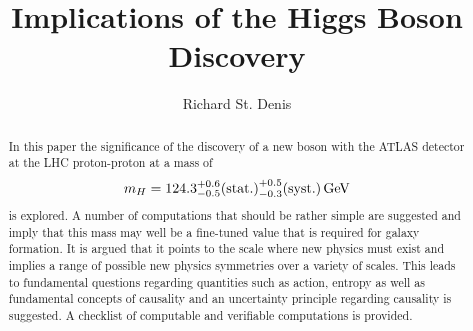 \documentclass[a4paper]{article}
\begin{document}
\linenumbers

\title{Implications of the Higgs Boson Discovery}

\author{Richard St. Denis }



\date{}
\maketitle
\begin{abstract}
  In this paper the significance of the discovery of
a new boson with the ATLAS detector at the LHC proton-proton
at a mass of
$$m_H = 124.3 ^{+0.6} _{-0.5} \rm {(stat.)} ^{+0.5}_{-0.3} 
\rm{(syst.)\, GeV}$$ is explored.  A number of computations that should
be rather simple are suggested and imply that this mass may well be a
fine-tuned value that is required for galaxy formation.  It is argued
that it points to the scale
 where new physics must exist and implies a range of possible new
physics symmetries over a variety of scales.  This leads to fundamental
questions regarding quantities such as action, entropy as well as fundamental
concepts of causality and an uncertainty principle regarding causality is
suggested.  A checklist of computable and verifiable computations is provided.
\end{abstract}
\end{document}
